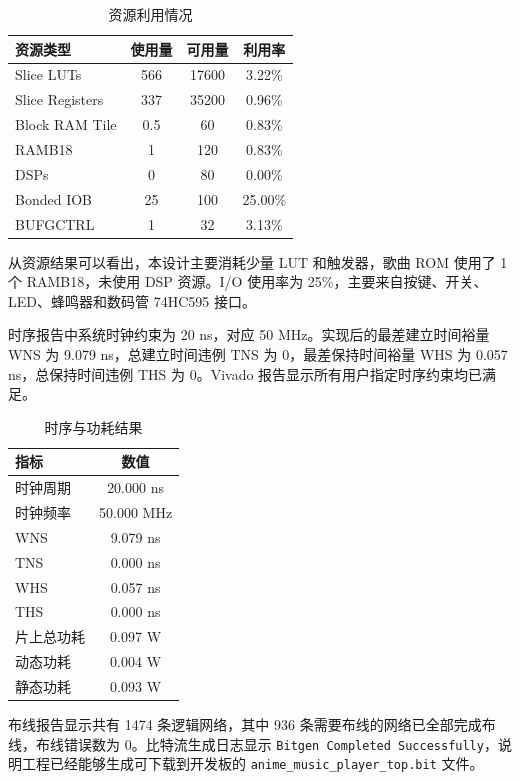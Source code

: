 \documentclass[UTF8,a4paper,12pt]{ctexart}
\begin{document}
\begin{table}[H]
  \centering
  \caption{资源利用情况}
  \begin{tabular}{lccc}
    \toprule
    资源类型 & 使用量 & 可用量 & 利用率 \\
    \midrule
    Slice LUTs & 566 & 17600 & 3.22\% \\
    Slice Registers & 337 & 35200 & 0.96\% \\
    Block RAM Tile & 0.5 & 60 & 0.83\% \\
    RAMB18 & 1 & 120 & 0.83\% \\
    DSPs & 0 & 80 & 0.00\% \\
    Bonded IOB & 25 & 100 & 25.00\% \\
    BUFGCTRL & 1 & 32 & 3.13\% \\
    \bottomrule
  \end{tabular}
\end{table}

从资源结果可以看出，本设计主要消耗少量 LUT 和触发器，歌曲 ROM 使用了 1 个 RAMB18，未使用 DSP 资源。I/O 使用率为 25\%，主要来自按键、开关、LED、蜂鸣器和数码管 74HC595 接口。

时序报告中系统时钟约束为 20 ns，对应 50 MHz。实现后的最差建立时间裕量 WNS 为 9.079 ns，总建立时间违例 TNS 为 0，最差保持时间裕量 WHS 为 0.057 ns，总保持时间违例 THS 为 0。Vivado 报告显示所有用户指定时序约束均已满足。

\begin{table}[H]
  \centering
  \caption{时序与功耗结果}
  \begin{tabular}{lc}
    \toprule
    指标 & 数值 \\
    \midrule
    时钟周期 & 20.000 ns \\
    时钟频率 & 50.000 MHz \\
    WNS & 9.079 ns \\
    TNS & 0.000 ns \\
    WHS & 0.057 ns \\
    THS & 0.000 ns \\
    片上总功耗 & 0.097 W \\
    动态功耗 & 0.004 W \\
    静态功耗 & 0.093 W \\
    \bottomrule
  \end{tabular}
\end{table}

布线报告显示共有 1474 条逻辑网络，其中 936 条需要布线的网络已全部完成布线，布线错误数为 0。比特流生成日志显示 \verb|Bitgen Completed Successfully|，说明工程已经能够生成可下载到开发板的 \verb|anime_music_player_top.bit| 文件。
\end{document}
